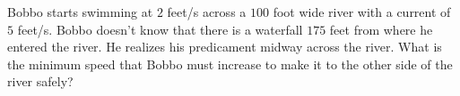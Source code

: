 Bobbo starts swimming at $2$ feet/s across a $100$ foot wide river with a current of $5$ feet/s.  Bobbo doesn’t know that there is a waterfall $175$ feet from where he entered the river. He realizes his predicament midway across the river. What is the minimum speed that Bobbo must increase to make it to the other side of the river safely?